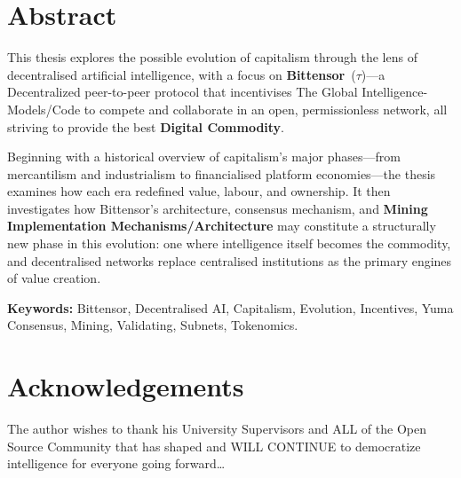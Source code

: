 \documentclass[12pt, a4paper, oneside]{report}
\newcommand{\TAO}{$\tau$}            %
\theoremstyle{definition}
\begin{document}
\chapter*{Abstract}

This thesis explores the possible evolution of capitalism through the lens of decentralised 
artificial intelligence, with a focus on \textbf{Bittensor}~(\TAO)—a Decentralized peer-to-peer 
protocol that incentivises The Global Intelligence-Models/Code to compete and collaborate in 
an open, permissionless network, all striving to provide the best \textbf{Digital Commodity}.

Beginning with a historical overview of capitalism's major phases—from mercantilism 
and industrialism to financialised platform economies—the thesis examines how each 
era redefined value, labour, and ownership. It then investigates how Bittensor's 
architecture, consensus mechanism, and \textbf{Mining Implementation Mechanisms/Architecture} may constitute 
a structurally new phase in this evolution: one where intelligence itself becomes 
the commodity, and decentralised networks replace centralised institutions as the 
primary engines of value creation.

\bigskip
\noindent\textbf{Keywords:} Bittensor, Decentralised AI, Capitalism, Evolution, Incentives, Yuma Consensus, Mining, Validating, Subnets, Tokenomics.

\chapter*{Acknowledgements}

The author wishes to thank his University Supervisors and ALL of the Open Source Community that has shaped and WILL CONTINUE to democratize intelligence for everyone going forward\dots

\tableofcontents
\listoffigures
\listoftables

\clearpage
{}
\setcounter{page}{1}








\end{document}
